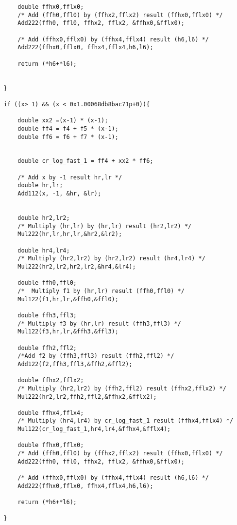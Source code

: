 \begin{lstlisting}
        double ffhx0,fflx0;
        /* Add (ffh0,ffl0) by (ffhx2,fflx2) result (ffhx0,fflx0) */
        Add222(ffh0, ffl0, ffhx2, fflx2, &ffhx0,&fflx0);
        
        /* Add (ffhx0,fflx0) by (ffhx4,fflx4) result (h6,l6) */
        Add222(ffhx0,fflx0, ffhx4,fflx4,h6,l6);

        return (*h6+*l6);

    
    }
    
    if ((x> 1) && (x < 0x1.00068db8bac71p+0)){
     
        double xx2 =(x-1) * (x-1);
        double ff4 = f4 + f5 * (x-1);
        double ff6 = f6 + f7 * (x-1);
        

        double cr_log_fast_1 = ff4 + xx2 * ff6;

        /* Add x by -1 result hr,lr */
        double hr,lr;
        Add112(x, -1, &hr, &lr);

        
        double hr2,lr2;
        /* Multiply (hr,lr) by (hr,lr) result (hr2,lr2) */
        Mul222(hr,lr,hr,lr,&hr2,&lr2);

        double hr4,lr4;
        /* Multiply (hr2,lr2) by (hr2,lr2) result (hr4,lr4) */
        Mul222(hr2,lr2,hr2,lr2,&hr4,&lr4);

        double ffh0,ffl0;
        /*  Multiply f1 by (hr,lr) result (ffh0,ffl0) */
        Mul122(f1,hr,lr,&ffh0,&ffl0);

        double ffh3,ffl3;
        /* Multiply f3 by (hr,lr) result (ffh3,ffl3) */
        Mul122(f3,hr,lr,&ffh3,&ffl3);

        double ffh2,ffl2;
        /*Add f2 by (ffh3,ffl3) result (ffh2,ffl2) */
        Add122(f2,ffh3,ffl3,&ffh2,&ffl2);

        double ffhx2,fflx2;
        /* Multiply (hr2,lr2) by (ffh2,ffl2) result (ffhx2,fflx2) */
        Mul222(hr2,lr2,ffh2,ffl2,&ffhx2,&fflx2);

        double ffhx4,fflx4;
        /* Multiply (hr4,lr4) by cr_log_fast_1 result (ffhx4,fflx4) */
        Mul122(cr_log_fast_1,hr4,lr4,&ffhx4,&fflx4);

        double ffhx0,fflx0;
        /* Add (ffh0,ffl0) by (ffhx2,fflx2) result (ffhx0,fflx0) */
        Add222(ffh0, ffl0, ffhx2, fflx2, &ffhx0,&fflx0);
        
        /* Add (ffhx0,fflx0) by (ffhx4,fflx4) result (h6,l6) */
        Add222(ffhx0,fflx0, ffhx4,fflx4,h6,l6);

        return (*h6+*l6);

    }
    

\end{lstlisting}
